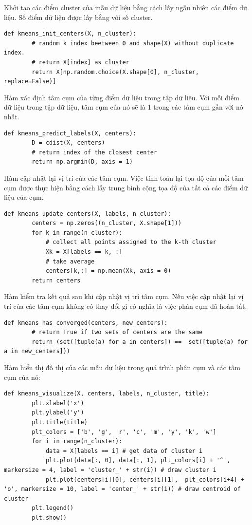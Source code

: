 \documentclass{article}
\begin{document}
	\newpage
	Khởi tạo các điểm cluster của mẫu dữ liệu bằng cách lấy ngẫu nhiên các điểm dữ liệu. Số điểm dữ liệu được lấy bằng với số cluster.
	\begin{lstlisting}[style=myPythonStyle]
	def kmeans_init_centers(X, n_cluster):
		# random k index beetween 0 and shape(X) without duplicate index.
		# return X[index] as cluster
		return X[np.random.choice(X.shape[0], n_cluster, replace=False)]
	\end{lstlisting}
	Hàm xác định tâm cụm của từng điểm dữ liệu trong tập dữ liệu. Với mỗi điểm dữ liệu trong tập dữ liệu, tâm cụm của nó sẽ là 1 trong các tâm cụm gần với nó nhất. 
	\begin{lstlisting}[style=myPythonStyle]
	def kmeans_predict_labels(X, centers):
		D = cdist(X, centers)
		# return index of the closest center
		return np.argmin(D, axis = 1)
	\end{lstlisting}
	Hàm cập nhật lại vị trí của các tâm cụm. Việc tính toán lại tọa độ của mỗi tâm cụm được thực hiện bằng cách lấy trung bình cộng tọa độ của tất cả các điểm dữ liệu của cụm.
	\begin{lstlisting}[style=myPythonStyle]
	def kmeans_update_centers(X, labels, n_cluster):
		centers = np.zeros((n_cluster, X.shape[1]))
		for k in range(n_cluster):
			# collect all points assigned to the k-th cluster 
			Xk = X[labels == k, :]
			# take average
			centers[k,:] = np.mean(Xk, axis = 0)
		return centers
	\end{lstlisting}
	Hàm kiểm tra kết quả sau khi cập nhật vị trí tâm cụm. Nếu việc cập nhật lại vị trí của các tâm cụm không có thay đổi gì có nghĩa là việc phân cụm đã hoàn tất.
	\begin{lstlisting}[style=myPythonStyle]
	def kmeans_has_converged(centers, new_centers):
		# return True if two sets of centers are the same
		return (set([tuple(a) for a in centers]) ==  set([tuple(a) for a in new_centers]))
	\end{lstlisting}
	Hàm hiển thị đồ thị của các mẫu dữ liệu trong quá trình phân cụm và các tâm cụm của nó:
	\begin{lstlisting}[style=myPythonStyle]
	def kmeans_visualize(X, centers, labels, n_cluster, title):
		plt.xlabel('x') 
		plt.ylabel('y') 
		plt.title(title) 
		plt_colors = ['b', 'g', 'r', 'c', 'm', 'y', 'k', 'w']
		for i in range(n_cluster):
			data = X[labels == i] # get data of cluster i
			plt.plot(data[:, 0], data[:, 1], plt_colors[i] + '^', markersize = 4, label = 'cluster_' + str(i)) # draw cluster i
			plt.plot(centers[i][0], centers[i][1],  plt_colors[i+4] + 'o', markersize = 10, label = 'center_' + str(i)) # draw centroid of cluster
		plt.legend()
		plt.show()
	\end{lstlisting}
\end{document}
